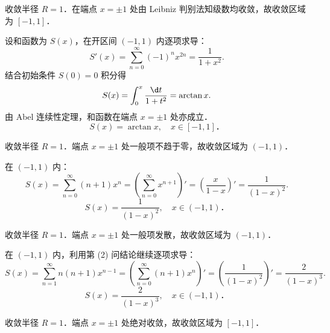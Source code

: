 \begin{solution}

    收敛半径 $R = 1$．在端点 $x = \pm 1$ 处由 Leibniz 判别法知级数均收敛，故收敛区域为 $[-1, 1]$．

    设和函数为 $S(x)$，在开区间 $(-1, 1)$ 内逐项求导：
    \begin{equation}
        S'(x) = \sum_{n=0}^\infty (-1)^n x^{2n} = \frac{1}{1 + x^2}.
    \end{equation}
    结合初始条件 $S(0) = 0$ 积分得
    \begin{equation}
        S(x) = \int_0^x \frac{\d t}{1 + t^2} = \arctan x.
    \end{equation}
    由 Abel 连续性定理，和函数在端点 $x = \pm 1$ 处亦成立．
    \begin{equation}
        \boxed{S(x) = \arctan x, \quad x \in [-1, 1]．}
    \end{equation}


    收敛半径 $R = 1$．端点 $x = \pm 1$ 处一般项不趋于零，故收敛区域为 $(-1, 1)$．

    在 $(-1, 1)$ 内：
    \begin{equation}
        S(x) = \sum_{n=0}^\infty (n + 1)x^n = \left( \sum_{n=0}^\infty x^{n+1} \right)' = \left( \frac{x}{1 - x} \right)' = \frac{1}{(1 - x)^2}.
    \end{equation}
    \begin{equation}
        \boxed{S(x) = \frac{1}{(1 - x)^2}, \quad x \in (-1, 1)．}
    \end{equation}


    收敛半径 $R = 1$．端点 $x = \pm 1$ 处一般项发散，故收敛区域为 $(-1, 1)$．

    在 $(-1, 1)$ 内，利用第 (2) 问结论继续逐项求导：
    \begin{equation}
        S(x) = \sum_{n=1}^\infty n(n + 1)x^{n-1} = \left( \sum_{n=0}^\infty (n + 1)x^n \right)' = \left( \frac{1}{(1 - x)^2} \right)' = \frac{2}{(1 - x)^3}.
    \end{equation}
    \begin{equation}
        \boxed{S(x) = \frac{2}{(1 - x)^3}, \quad x \in (-1, 1)．}
    \end{equation}


    收敛半径 $R = 1$．端点 $x = \pm 1$ 处绝对收敛，故收敛区域为 $[-1, 1]$．


\end{solution}
